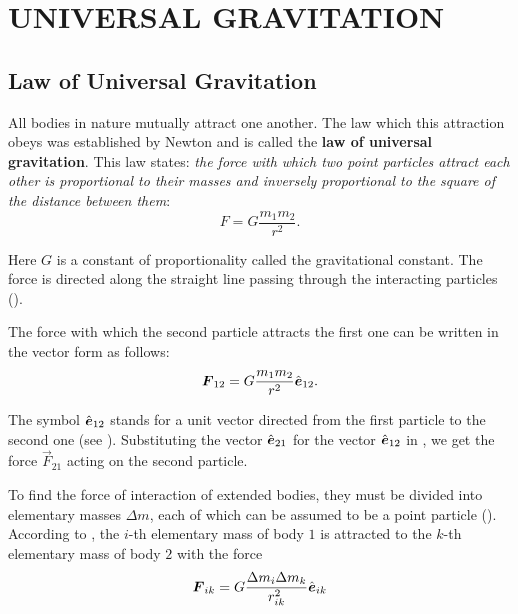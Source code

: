 

\chapter{UNIVERSAL GRAVITATION}\label{chap:6}

\section{Law of Universal Gravitation}\label{sec:6_1}

All bodies in nature mutually attract one another. The law which this attraction obeys was established by Newton and is called the \textbf{law of universal gravitation}. This law states: \textit{the force with which two point particles attract each other is proportional to their masses and inversely proportional to the square of the distance between them}:
\begin{equation}\label{eq:6_1}
	F = G\frac{m_1m_2}{r^2}.
\end{equation}

\noindent
Here $G$ is a constant of proportionality called the gravitational constant. The force is directed along the straight line passing through the interacting particles ().

The force with which the second particle attracts the first one can be written in the vector form as follows:
\begin{equation}\label{eq:6_2}
	\boldsymbol{F}_{12} = G\frac{m_1m_2}{r^2}\hat{\boldsymbol{e}}_{12}.
\end{equation}

The symbol $\hat{\boldsymbol{e}}_{12}$ stands for a unit vector directed from the first particle to the second one (see ). Substituting the vector $\hat{\boldsymbol{e}}_{21}$ for the vector $\hat{\boldsymbol{e}}_{12}$ in , we get the force $\vec{F}_{21}$ acting on the second particle.

To find the force of interaction of extended bodies, they must be divided into elementary masses $\Delta m$, each of which can be assumed to be a point particle (). According to , the $i$-th elementary mass of body $1$ is attracted to the $k$-th elementary mass of body $2$ with the force
\begin{equation}\label{eq:6_3}
	\boldsymbol{F}_{ik} = G\frac{\Delta m_i\Delta m_k}{r_{ik}^2}\hat{\boldsymbol{e}}_{ik}
\end{equation}

